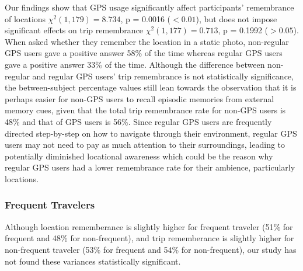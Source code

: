 \documentclass{sigchi}
\begin{document}
Our findings show that GPS usage significantly affect participants' remembrance of locations $\chi^2(1,179) = 8.734$, p = 0.0016 ($< 0.01$), but does not impose significant effects on trip remembrance $\chi^2(1,177) = 0.713$, p = 0.1992 ($> 0.05$).  When asked whether they remember the location in a static photo, non-regular GPS users gave a positive answer 58\% of the time whereas regular GPS users gave a positive answer 33\% of the time. Although the difference between non-regular and regular GPS users' trip remembrance is not statistically significance, the between-subject percentage values still lean towards the observation that it is perhaps easier for non-GPS users to recall episodic memories from external memory cues, given that the total trip remembrance rate for non-GPS users is 48\% and that of GPS users is 56\%. Since regular GPS users are frequently directed step-by-step on how to navigate through their environment, regular GPS users may not need to pay as much attention to their surroundings, leading to potentially diminished locational awareness which could be the reason why regular GPS users had a lower remembrance rate for their ambience, particularly locations. \\


\subsubsection{Frequent Travelers}
Although location rememberance is slightly higher for frequent traveler (51\% for frequent and 48\% for non-frequent), and trip rememberance is slightly higher for non-frequent traveler (53\% for frequent and 54\% for non-frequent), our study has not found these variances statistically significant. 
\end{document}
